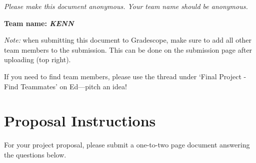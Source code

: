 \emph{Please make this document anonymous. Your team name should be anonymous.}

\textbf{Team name: \emph{KENN }}

\emph{Note:} when submitting this document to Gradescope, make sure to add all other team members to the submission. This can be done on the submission page after uploading (top right).

If you need to find team members, please use the thread under `Final Project - Find Teammates' on Ed---pitch an idea!

\section*{Proposal Instructions}

For your project proposal, please submit a one-to-two page document answering the questions below.

